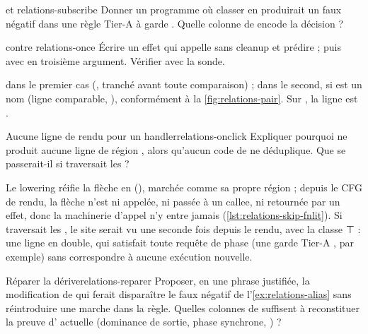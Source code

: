 \begin{exercice}{ et }{relations-subscribe}
Donner un programme où classer  en  produirait un faux négatif dans une règle Tier-A à garde . Quelle colonne de  encode la décision ?
\end{exercice}

\begin{exercice}{ contre }{relations-once}
Écrire un effet qui appelle  sans cleanup et prédire  ; puis avec  en troisième argument. Vérifier avec la sonde.
\end{exercice}
\begin{solution}
 dans le premier cas (, tranché avant toute comparaison) ;  dans le second, si  est un nom (ligne comparable, ), conformément à la \cref{fig:relations-pair}. Sur , la ligne  est .
\end{solution}

\begin{exercice}{Aucune ligne de rendu pour un handler}{relations-onclick}
Expliquer pourquoi  ne produit aucune ligne de région , alors qu'aucun code de  ne déduplique. Que se passerait-il si  traversait les  ?
\end{exercice}
\begin{solution}
Le lowering réifie la flèche en  (), marchée comme sa propre région ; depuis le CFG de rendu, la flèche n'est ni appelée, ni passée à un callee, ni retournée par un effet, donc la machinerie d'appel n'y entre jamais (\cref{lst:relations-skip-fnlit}). Si  traversait les , le site serait vu une seconde fois depuis le rendu, avec la classe ⊤ : une ligne  en double, qui satisfait toute requête de phase (une garde Tier-A , par exemple) sans correspondre à aucune exécution nouvelle.
\end{solution}

\begin{exercice}{Réparer la dérive}{relations-reparer}
Proposer, en une phrase justifiée, la modification de  qui ferait disparaître le faux négatif de l'\cref{ex:relations-alias} sans réintroduire une marche dans la règle. Quelles colonnes de  suffisent à reconstituer la preuve d'\Error{} actuelle (dominance de sortie, phase synchrone, ) ?
\end{exercice}
